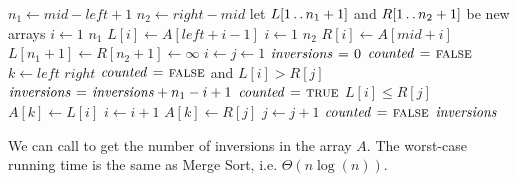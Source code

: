 \begin{codebox}
\li	$n_1 \gets mid - left + 1$
\li	$n_2 \gets right - mid$
\li	let $L[1 \mathinner{\ldotp\ldotp} n_1+1]$ and $R[1 \mathinner{\ldotp\ldotp} n_2 + 1]$ be new arrays
\li	\For $i \gets 1$ \To $n_1$
\li	\Do
		$L[i] \gets A[left + i - 1]$
	\End
\li	\For $i \gets 1$ \To $n_2$
\li	\Do
		$R[i] \gets A[mid + i]$
	\End
\li	$L[n_1 + 1] \gets R[n_2 + 1] \gets \infty$
\li	$i \gets j \gets 1$
\li	$\id{inversions} \gets 0$
\li	$\id{counted} \gets \const{false}$
\li	\For $k \gets left$ \To $right$
\li	\Do
		\If $\id{counted} \gets \const{false}$ and $L[i] > R[j]$
\li		\Then
			$\id{inversions} \gets \id{inversions} + n_1 - i + 1$
\li			$\id{counted} \gets \const{true}$
		\End
\li		\If $L[i] \leq R[j]$
\li		\Then
			$A[k] \gets L[i]$
\li			$i \gets i + 1$
\li		\ElseNoIf
			$A[k] \gets R[j]$
\li			$j \gets j + 1$
\li			$\id{counted} \gets \const{false}$
		\End
	\End
\li	\Return $\id{inversions}$
\end{codebox}

We can call  to get the number of inversions in the array $A$.
The worst-case running time is the same as Merge Sort, i.e. $\Theta(n\log(n))$.

